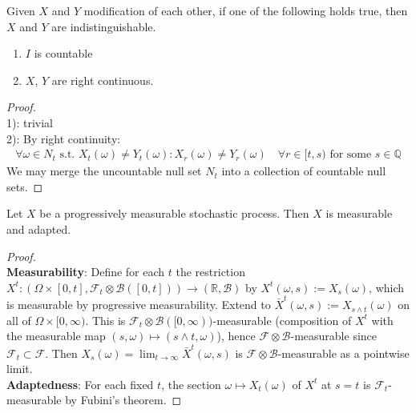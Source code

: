 \begin{lemma}
	Given $X$ and $Y$ modification of each other, if one of the following holds true, then $X$ and $Y$ are indistinguishable. 
	\begin{enumerate}
		\item $I$ is countable
		\item $X$, $Y$ are right continuous. 
	\end{enumerate}
\end{lemma}
\begin{proof}\quad\\
1): trivial\\
2): By right continuity:
\begin{align*}
	\forall \omega \in N_t\text{ s.t. } X_t(\omega) \neq Y_t(\omega): X_r(\omega) \neq Y_r(\omega) \quad \forall r \in [t, s) \text{ for some } s \in \mathbb{Q}
\end{align*}	
We may merge the uncountable null set $N_t$ into a collection of countable null sets. 
\end{proof}

\begin{lemma}
	Let $X$ be a progressively measurable stochastic process. Then $X$ is measurable and adapted.
\end{lemma}
\begin{proof}
	\quad\\
	\textbf{Measurability}: Define for each $t$ the restriction $X^t: (\Omega \times [0,t], \mathcal{F}_t \otimes \mathcal{B}([0,t])) \to (\mathbb{R}, \mathcal{B})$ by $X^t(\omega, s) := X_s(\omega)$, which is measurable by progressive measurability. 
	Extend to $\bar{X}^t(\omega, s) := X_{s \wedge t}(\omega)$ on all of $\Omega \times [0,\infty)$. 
	This is $\mathcal{F}_t \otimes \mathcal{B}([0,\infty))$-measurable (composition of $X^t$ with the measurable map $(s, \omega) \mapsto (s \wedge t, \omega)$), hence $\mathcal{F} \otimes \mathcal{B}$-measurable since $\mathcal{F}_t \subset \mathcal{F}$. 
	Then $X_s(\omega) = \lim_{t \to \infty} \bar{X}^t(\omega, s)$ is $\mathcal{F} \otimes \mathcal{B}$-measurable as a pointwise limit.\\
	\textbf{Adaptedness}: For each fixed $t$, the section $\omega \mapsto X_t(\omega)$ of $X^t$ at $s = t$ is $\mathcal{F}_t$-measurable by Fubini's theorem.
\end{proof}


